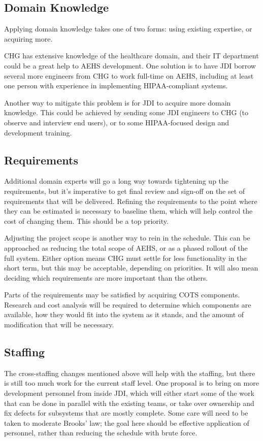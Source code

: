 \documentclass[12pt]{article}
\begin{document}
\subsection{Domain Knowledge}
Applying domain knowledge takes one of two forms: using existing expertise, or acquiring more.

CHG has extensive knowledge of the healthcare domain, and their IT department could be a great help
to AEHS development.  One solution is to have JDI borrow several more engineers from CHG to work
full-time on AEHS, including at least one person with experience in implementing HIPAA-compliant
systems.

Another way to mitigate this problem is for JDI to acquire more domain knowledge.  This could be
achieved by sending some JDI engineers to CHG (to observe and interview end users), or to some
HIPAA-focused design and development training.


\subsection{Requirements}
Additional domain experts will go a long way towards tightening up the requirements, but it's
imperative to get final review and sign-off on the set of requirements that will be delivered.
Refining the requirements to the point where they can be estimated is necessary to baseline them,
which will help control the cost of changing them.  This should be a top priority.

Adjusting the project scope is another way to rein in the schedule.  This can be approached as
reducing the total scope of AEHS, or as a phased rollout of the full system.  Either option means
CHG must settle for less functionality in the short term, but this may be acceptable, depending on
priorities.  It will also mean deciding which requirements are more important than the others.

Parts of the requirements may be satisfied by acquiring COTS components.  Research and cost analysis
will be required to determine which components are available, how they would fit into the system as
it stands, and the amount of modification that will be necessary.

\subsection{Staffing}
The cross-staffing changes mentioned above will help with the staffing, but there is still too much
work for the current staff level.  One proposal is to bring on more development personnel from
inside JDI, which will either start some of the work that can be done in parallel with the existing
teams, or take over ownership and fix defects for subsystems that are mostly complete.  Some care
will need to be taken to moderate Brooks' law; the goal here should be effective application of
personnel, rather than reducing the schedule with brute force.
\end{document}
